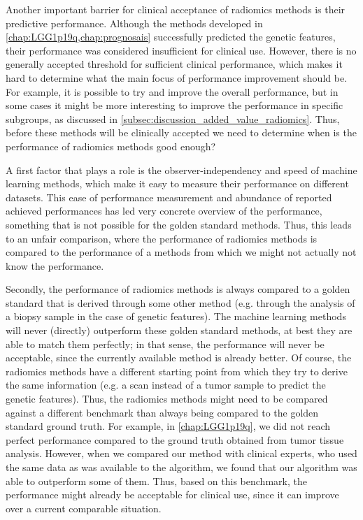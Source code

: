 Another important barrier for clinical acceptance of radiomics methods is their predictive performance.
Although the methods developed in \cref{chap:LGG1p19q,chap:prognosais} successfully predicted the genetic features, their performance was considered insufficient for clinical use.
However, there is no generally accepted threshold for sufficient clinical performance, which makes it hard to determine what the main focus of performance improvement should be.
For example, it is possible to try and improve the overall performance, but in some cases it might be more interesting to improve the performance in specific subgroups, as discussed in \cref{subsec:discussion_added_value_radiomics}.
Thus, before these methods will be clinically accepted we need to determine when is the performance of radiomics methods good enough?

A first factor that plays a role is the observer-independency and speed of machine learning methods, which make it easy to measure their performance on different datasets.
This ease of performance measurement and abundance of reported achieved performances has led very concrete overview of the performance, something that is not possible for the golden standard methods.
Thus, this leads to an unfair comparison, where the performance of radiomics methods is compared to the performance of a methods from which we might not actually not know the performance.

Secondly, the performance of radiomics methods is always compared to a golden standard that is derived through some other method (e.g. through the analysis of a biopsy sample in the case of genetic features).
The machine learning methods will never (directly) outperform these golden standard methods, at best they are able to match them perfectly; in that sense, the performance will never be acceptable, since the currently available method is already better.
Of course, the radiomics methods have a different starting point from which they try to derive the same information (e.g. a scan instead of a tumor sample to predict the genetic features).
Thus, the radiomics methods might need to be compared against a different benchmark than always being compared to the golden standard ground truth.
For example, in \cref{chap:LGG1p19q}, we did not reach perfect performance compared to the ground truth obtained from tumor tissue analysis.
However, when we compared our method with clinical experts, who used the same data as was available to the algorithm, we found that our algorithm was able to outperform some of them.
Thus, based on this benchmark, the performance might already be acceptable for clinical use, since it can improve over a current comparable situation.

